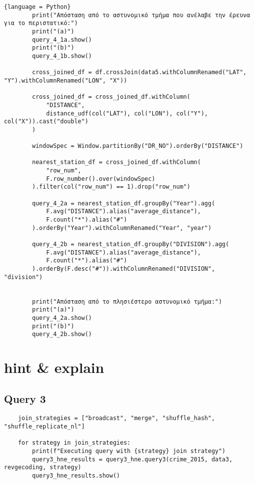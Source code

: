 \documentclass{article}
\begin{document}
\begin{lstlisting}{language = Python}
        print("Απόσταση από το αστυνομικό τμήμα που ανέλαβε την έρευνα για το περιστατικό:")
        print("(a)")
        query_4_1a.show() 
        print("(b)")
        query_4_1b.show() 

        cross_joined_df = df.crossJoin(data5.withColumnRenamed("LAT", "Y").withColumnRenamed("LON", "X"))

        cross_joined_df = cross_joined_df.withColumn(
            "DISTANCE",
            distance_udf(col("LAT"), col("LON"), col("Y"), col("X")).cast("double")
        )

        windowSpec = Window.partitionBy("DR_NO").orderBy("DISTANCE")

        nearest_station_df = cross_joined_df.withColumn(
            "row_num",
            F.row_number().over(windowSpec)
        ).filter(col("row_num") == 1).drop("row_num")

        query_4_2a = nearest_station_df.groupBy("Year").agg(
            F.avg("DISTANCE").alias("average_distance"),
            F.count("*").alias("#")
        ).orderBy("Year").withColumnRenamed("Year", "year")

        query_4_2b = nearest_station_df.groupBy("DIVISION").agg(
            F.avg("DISTANCE").alias("average_distance"),
            F.count("*").alias("#")
        ).orderBy(F.desc("#")).withColumnRenamed("DIVISION", "division")


        print("Απόσταση από το πλησιέστερο αστυνομικό τμήμα:")
        print("(a)")
        query_4_2a.show()
        print("(b)")
        query_4_2b.show()
\end{lstlisting}


\section*{hint \& explain}

\subsection*{Query 3}

\begin{lstlisting}
    join_strategies = ["broadcast", "merge", "shuffle_hash", "shuffle_replicate_nl"]

    for strategy in join_strategies:
        print(f"Executing query with {strategy} join strategy")
        query3_hne_results = query3_hne.query3(crime_2015, data3, revgecoding, strategy)
        query3_hne_results.show()
\end{lstlisting}
\end{document}
